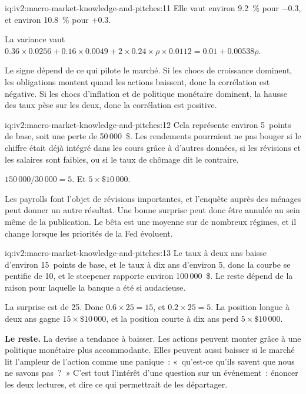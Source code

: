 \begin{solution}{iq:iv2:macro-market-knowledge-and-pitches:11}
Elle vaut environ 9.2~\% pour $-0.3$, et environ 10.8~\% pour $+0.3$.

La variance vaut $0.36 \times 0.0256 + 0.16 \times 0.0049 + 2 \times 0.24 \times \rho \times 0.0112 = 0.01 + 0.00538\rho$.

Le signe dépend de ce qui pilote le marché. Si les chocs de croissance dominent, les obligations montent quand les actions baissent, donc la corrélation est négative. Si les chocs d'inflation et de politique monétaire dominent, la hausse des taux pèse sur les deux, donc la corrélation est positive.

\end{solution}

\begin{solution}{iq:iv2:macro-market-knowledge-and-pitches:12}
Cela représente environ 5~points de base, soit une perte de 50\,000~\$. Les rendements pourraient ne pas bouger si le chiffre était déjà intégré dans les cours grâce à d'autres données, si les révisions et les salaires sont faibles, ou si le taux de chômage dit le contraire.

$150\,000/30\,000 = 5$. Et $5 \times \$10\,000$.

Les payrolls font l'objet de révisions importantes, et l'enquête auprès des ménages peut donner un autre résultat. Une bonne surprise peut donc être annulée au sein même de la publication. Le bêta est une moyenne sur de nombreux régimes, et il change lorsque les priorités de la Fed évoluent.

\end{solution}

\begin{solution}{iq:iv2:macro-market-knowledge-and-pitches:13}
Le taux à deux ans baisse d'environ 15~points de base, et le taux à dix ans d'environ 5, donc la courbe se pentifie de 10, et le steepener rapporte environ 100\,000~\$. Le reste dépend de la raison pour laquelle la banque a été si audacieuse.

La surprise est de 25. Donc $0.6 \times 25 = 15$, et $0.2 \times 25 = 5$. La position longue à deux ans gagne $15 \times \$10\,000$, et la position courte à dix ans perd $5 \times \$10\,000$.

\textbf{Le reste.} La devise a tendance à baisser. Les actions peuvent monter grâce à une politique monétaire plus accommodante. Elles peuvent aussi baisser si le marché lit l'ampleur de l'action comme une panique~: «~qu'est-ce qu'ils savent que nous ne savons pas~?~» C'est tout l'intérêt d'une question sur un événement~: énoncer les deux lectures, et dire ce qui permettrait de les départager.

\end{solution}

